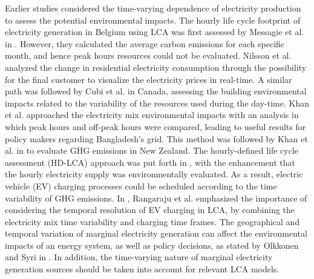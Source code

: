 {Earlier studies  considered the time-varying dependence of electricity production to assess the potential environmental impacts. {The hourly life cycle footprint of electricity generation in Belgium using LCA was first assessed by Messagie et al. in \cite{MESSAGIE2014469}. However, they calculated the average carbon emissions for each specific month, and hence peak hours resources could not be evaluated.} Nilsson et al. \cite{Nilsson2017AssessingEmissions} analyzed the change in residential electricity consumption through the possibility for the final customer to visualize the electricity prices in real-time. A similar path was followed by Cubi et al. \cite{Cubi2015IncorporationAssessment} in Canada, assessing the building environmental impacts related to the variability of the resources used during the day-time. 
Khan et al. \cite{Khan2018} approached the electricity mix environmental impacts with an analysis in which peak hours and off-peak hours were compared, leading to useful results for policy makers regarding Bangladesh's grid. This method was followed by Khan et al. in \cite{Khan2018AnalysisIntensity} to evaluate GHG emissions in New Zealand. {The hourly-defined life cycle assessment (HD-LCA) approach was put forth in \cite{Baumann2019}, with the enhancement that the hourly electricity supply was environmentally evaluated. 
 As a result, electric vehicle (EV) charging processes could be scheduled according to the time variability of GHG emissions. In \cite{RANGARAJU2015496}, Rangaraju et al. emphasized the importance of considering the temporal resolution of EV charging in LCA, by combining the electricity mix time variability and charging time frames.}
{The geographical and temporal variation of marginal electricity generation can affect the environmental impacts of an energy system, as well as  policy decisions, as stated by Olkkonen and Syri in \cite{Olkkonen2016Spatial2030}. In addition, the time-varying nature of marginal electricity generation sources should be taken into account for relevant LCA models.}


}
